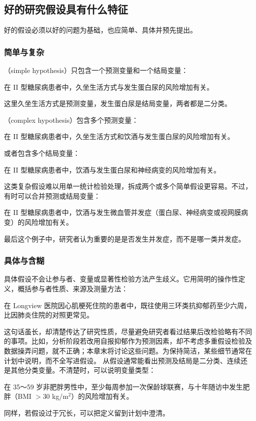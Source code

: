 \subsection{好的研究假设具有什么特征}
好的假设必须以好的问题为基础，也应简单、具体并预先提出。
\subsubsection{简单与复杂}
（simple hypothesis）只包含一个预测变量和一个结局变量：
\begin{studyquote}在 II 型糖尿病患者中，久坐生活方式与发生蛋白尿的风险增加有关。\end{studyquote}
这里久坐生活方式是预测变量，发生蛋白尿是结局变量，两者都是二分类。

（complex hypothesis）包含多个预测变量：
\begin{studyquote}在 II 型糖尿病患者中，久坐生活方式和饮酒与发生蛋白尿的风险增加有关。\end{studyquote}
或者包含多个结局变量：
\begin{studyquote}在 II 型糖尿病患者中，饮酒与发生蛋白尿和神经病变的风险增加有关。\end{studyquote}
这类复杂假设难以用单一统计检验处理，拆成两个或多个简单假设更容易。不过，有时可以合并预测或结局变量：
\begin{studyquote}在 II 型糖尿病患者中，饮酒与发生微血管并发症（蛋白尿、神经病变或视网膜病变）的风险增加有关。\end{studyquote}
最后这个例子中，研究者认为重要的是是否发生并发症，而不是哪一类并发症。

\subsubsection{具体与含糊}
具体假设不会让参与者、变量或显著性检验方法产生歧义。它用简明的操作性定义，概括参与者性质、来源及测量方法：
\begin{studyquote}在 Longview 医院因心肌梗死住院的患者中，既往使用三环类抗抑郁药至少六周，比因肺炎住院的对照更常见。\end{studyquote}
这句话虽长，却清楚传达了研究性质，尽量避免研究者看过结果后改检验略有不同的事项。比如，分析阶段若改用自报抑郁作为预测因素，却不考虑多重假设检验及数据操弄问题，就不正确；本章末将讨论这些问题。为保持简洁，某些细节通常在计划中说明，而不全写进假设。
从假设通常能看出预测及结局是二分类、连续还是其他分类变量。不清楚时，可以说明变量类型：
\begin{studyquote}在 35～59 岁非肥胖男性中，至少每周参加一次保龄球联赛，与十年随访中发生肥胖（BMI $>30$ kg/m$^2$）的风险增加有关。\end{studyquote}
同样，若假设过于冗长，可以把定义留到计划中澄清。

